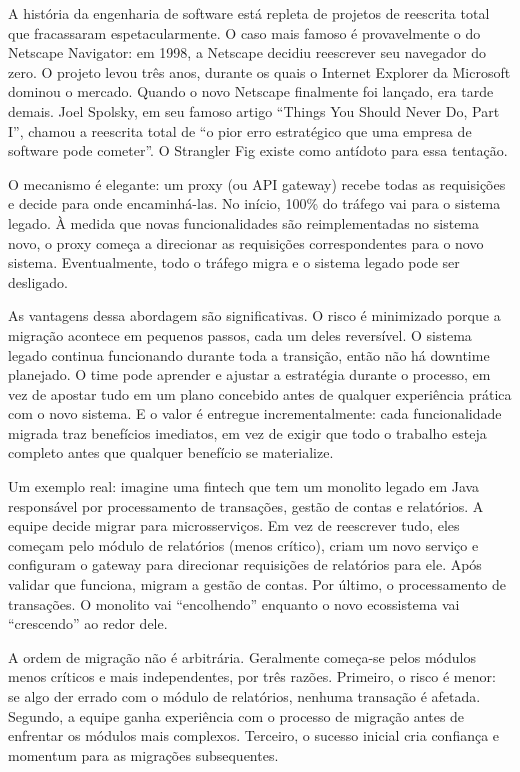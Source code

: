 A história da engenharia de software está repleta de projetos de reescrita
total que fracassaram espetacularmente. O caso mais famoso é provavelmente o
do Netscape Navigator: em 1998, a Netscape decidiu reescrever seu navegador
do zero. O projeto levou três anos, durante os quais o Internet Explorer da
Microsoft dominou o mercado. Quando o novo Netscape finalmente foi lançado,
era tarde demais. Joel Spolsky, em seu famoso artigo ``Things You Should
Never Do, Part I'', chamou a reescrita total de ``o pior erro estratégico
que uma empresa de software pode cometer''. O Strangler Fig existe como
antídoto para essa tentação.

O mecanismo é elegante: um proxy (ou API gateway) recebe todas as requisições e
decide para onde encaminhá-las. No início, 100\% do tráfego vai para o sistema
legado. À medida que novas funcionalidades são reimplementadas no sistema novo,
o proxy começa a direcionar as requisições correspondentes para o novo sistema.
Eventualmente, todo o tráfego migra e o sistema legado pode ser desligado.

As vantagens dessa abordagem são significativas. O risco é minimizado porque a
migração acontece em pequenos passos, cada um deles reversível. O sistema legado
continua funcionando durante toda a transição, então não há downtime planejado.
O time pode aprender e ajustar a estratégia durante o processo, em vez de
apostar tudo em um plano concebido antes de qualquer experiência prática com
o novo sistema. E o valor é entregue incrementalmente: cada funcionalidade
migrada traz benefícios imediatos, em vez de exigir que todo o trabalho
esteja completo antes que qualquer benefício se materialize.

Um exemplo real: imagine uma fintech que tem um monolito legado em Java responsável
por processamento de transações, gestão de contas e relatórios. A equipe decide
migrar para microsserviços. Em vez de reescrever tudo, eles começam pelo módulo
de relatórios (menos crítico), criam um novo serviço e configuram o gateway para
direcionar requisições de relatórios para ele. Após validar que funciona, migram
a gestão de contas. Por último, o processamento de transações. O monolito vai
``encolhendo'' enquanto o novo ecossistema vai ``crescendo'' ao redor dele.

A ordem de migração não é arbitrária. Geralmente começa-se pelos módulos menos
críticos e mais independentes, por três razões. Primeiro, o risco é menor:
se algo der errado com o módulo de relatórios, nenhuma transação é afetada.
Segundo, a equipe ganha experiência com o processo de migração antes de
enfrentar os módulos mais complexos. Terceiro, o sucesso inicial cria
confiança e momentum para as migrações subsequentes.

